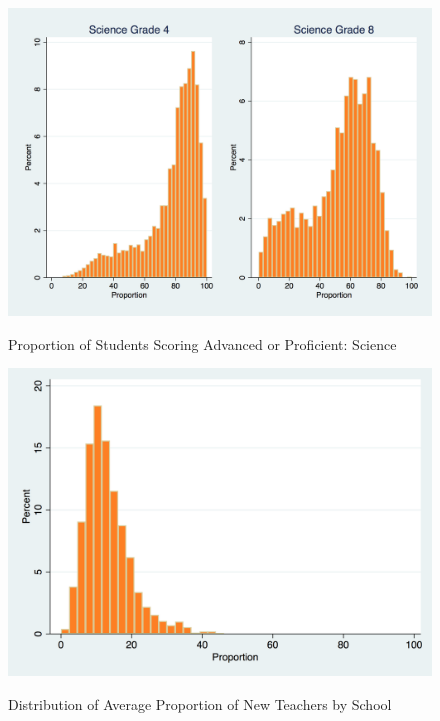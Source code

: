 \documentclass[12pt]{report}
\begin{document}
\begin{figure}[!htb]
    \centering
      \caption{Proportion of Students Scoring Advanced or Proficient: Science}
    \includegraphics[frame, scale=0.25]{science_performance_distribution.png}
    \label{fig:my_label}
\end{figure}
\clearpage
\begin{figure}[!htb]
    \centering
      \caption{Distribution of Average Proportion of New Teachers by School}
    \includegraphics[frame, scale=0.25]{hist_prop_new_rev.png}
    \label{fig:my_label}
\end{figure}
\clearpage
\end{document}
